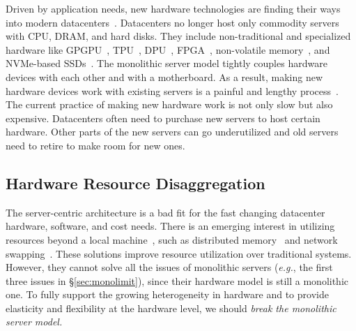 \documentclass[10pt,times,twocolumn]{z2-article}
\renewcommand{\em}{\it}
\newcommand{\eg}{\textit{e.g.}}
\providecommand{\DIFdelbegin}{} %
\providecommand{\DIFdelend}{} %
\newcommand{\DIFscaledelfig}{0.5}
\newlength{\DIFdelgraphicswidth} %
\newlength{\DIFdelgraphicsheight} %
\newcommand{\DIFdelincludegraphics}[2][]{%
\sbox{\DIFdelgraphicsbox}{\DIFOincludegraphics[#1]{#2}}%
\settoboxwidth{\DIFdelgraphicswidth}{\DIFdelgraphicsbox} %
\settoboxtotalheight{\DIFdelgraphicsheight}{\DIFdelgraphicsbox} %
\scalebox{\DIFscaledelfig}{%
\parbox[b]{\DIFdelgraphicswidth}{\usebox{\DIFdelgraphicsbox}\\[-\baselineskip] \rule{\DIFdelgraphicswidth}{0em}}\llap{\resizebox{\DIFdelgraphicswidth}{\DIFdelgraphicsheight}{%
\setlength{\unitlength}{\DIFdelgraphicswidth}%
\begin{picture}(1,1)%
\thicklines\linethickness{2pt} %
{\color[rgb]{1,0,0}\put(0,0){\framebox(1,1){}}}%
{\color[rgb]{1,0,0}\put(0,0){\line( 1,1){1}}}%
{\color[rgb]{1,0,0}\put(0,1){\line(1,-1){1}}}%
\end{picture}%
}\hspace*{3pt}}} %
} %
\DeclareRobustCommand{\DIFdelbegin}{\DIFOdelbegin \let\includegraphics\DIFdelincludegraphics} %
\DeclareRobustCommand{\DIFdelend}{\DIFOaddend \let\includegraphics\DIFOincludegraphics} %
\begin{document}
{
Driven by application needs, new hardware technologies are finding their ways into modern datacenters~\cite{sigarch-dc}.
Datacenters no longer host only commodity servers with CPU, DRAM, and hard disks. 
They include non-traditional and specialized hardware like GPGPU~\cite{GPU-google,GPU-aws}, 
TPU~\cite{TPU}, 
DPU~\cite{DPU},
FPGA~\cite{Putnam14-FPGA,Amazon-F1}, %
non-volatile memory~\cite{Intel3DXpoint}, %
and NVMe-based SSDs~\cite{everspin}.
The monolithic server model tightly couples hardware devices with each other and with a motherboard.
As a result, making new hardware devices work with existing servers is a painful and lengthy process~\cite{Putnam14-FPGA}.
\DIFdelbegin %
\DIFdelend The current practice of making new hardware work is not only slow but also expensive.
Datacenters often need to purchase new servers to host certain hardware.
Other parts of the new servers can go underutilized 
and old servers need to retire to make room for new ones.

\subsection{Hardware Resource Disaggregation}
The server-centric architecture is a bad fit for the fast changing datacenter hardware, software, and cost needs.
There is an emerging interest in utilizing resources beyond a local machine~\cite{Gao16-OSDI},
such as distributed memory~\cite{Dragojevic14-FaRM,Nelson15-ATC,Aguilera17-SOCC,Novakovic16-SOCC} and network swapping~\cite{GU17-NSDI}. 
These solutions improve resource utilization over traditional systems.
However, they cannot solve all the issues of monolithic servers (\eg, the first three issues in \S\ref{sec:monolimit}), 
since their hardware model is still a monolithic one.
To fully support the growing heterogeneity in hardware and to provide elasticity and flexibility at the hardware level, 
we should {\em break the monolithic server model.}%

}
\end{document}
